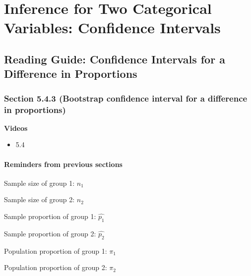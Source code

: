 \documentclass[
]{report}
\providecommand{\tightlist}{%
  \setlength{\itemsep}{0pt}\setlength{\parskip}{0pt}}
\begin{document}
\hypertarget{inference-for-two-categorical-variables-confidence-intervals}{%
\chapter{Inference for Two Categorical Variables: Confidence Intervals}\label{inference-for-two-categorical-variables-confidence-intervals}}

\hypertarget{reading-guide-confidence-intervals-for-a-difference-in-proportions}{%
\section{Reading Guide: Confidence Intervals for a Difference in Proportions}\label{reading-guide-confidence-intervals-for-a-difference-in-proportions}}

\hypertarget{section-5.4.3-bootstrap-confidence-interval-for-a-difference-in-proportions}{%
\subsection*{Section 5.4.3 (Bootstrap confidence interval for a difference in proportions)}\label{section-5.4.3-bootstrap-confidence-interval-for-a-difference-in-proportions}}

\textbf{Videos}

\begin{itemize}
\tightlist
\item
  5.4
\end{itemize}


\hypertarget{reminders-from-previous-sections-5}{%
\subsubsection*{Reminders from previous sections}\label{reminders-from-previous-sections-5}}

Sample size of group 1: \(n_1\)

Sample size of group 2: \(n_2\)

Sample proportion of group 1: \(\hat{p_1}\)

Sample proportion of group 2: \(\hat{p_2}\)

Population proportion of group 1: \(\pi_1\)

Population proportion of group 2: \(\pi_2\)
\end{document}
